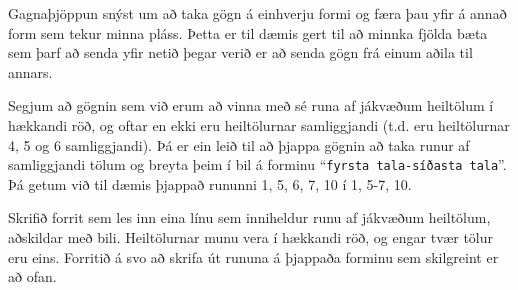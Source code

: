 \begin{problem}
	Gagnaþjöppun snýst um að taka gögn á einhverju formi og færa þau yfir á annað form sem tekur minna pláss. Þetta er til dæmis gert til að minnka fjölda bæta sem þarf að senda yfir netið þegar verið er að senda gögn frá einum aðila til annars.

	Segjum að gögnin sem við erum að vinna með sé runa af jákvæðum heiltölum í hækkandi röð, og oftar en ekki eru heiltölurnar samliggjandi (t.d. eru heiltölurnar 4, 5 og 6 samliggjandi). Þá er ein leið til að þjappa gögnin að taka runur af samliggjandi tölum og breyta þeim í bil á forminu "`\texttt{fyrsta tala-síðasta tala}"'. Þá getum við til dæmis þjappað rununni 1, 5, 6, 7, 10 í 1, 5-7, 10.

	Skrifið forrit sem les inn eina línu sem inniheldur runu af jákvæðum heiltölum, aðskildar með bili. Heiltölurnar munu vera í hækkandi röð, og engar tvær tölur eru eins. Forritið á svo að skrifa út rununa á þjappaða forminu sem skilgreint er að ofan.

\begin{example}
%
\end{example}
\begin{example}
%
\end{example}
\begin{example}
%
\end{example}
\end{problem}